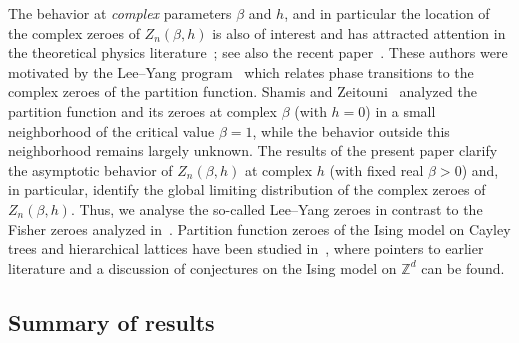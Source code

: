 \documentclass[10pt]{amsart}
\theoremstyle{definition}\newtheorem{defi}[theo]{Definition}\newtheorem{rema}[theo]{Remark}\newtheorem{exam}[theo]{Example}\newtheorem{exem}[theo]{Example}\newtheorem{nota}[theo]{Notation}
\newcommand{\Z}{\mathbb{Z}}
\begin{document}
The behavior at \emph{complex} parameters $\beta$ and $h$, and in particular the location of the complex zeroes of $Z_n(\beta, h)$ is also of interest and has attracted attention in the theoretical physics literature~\cite{deger_brange_flindt,
deger_flindt,glasser_etal,Krasnytska}; see also the recent paper~\cite{newman_motion_yee_yang}. These authors were motivated by the Lee--Yang program~\cite{fisher,lee_yangII,lee_yangI} which relates phase transitions to the complex zeroes of the partition function. Shamis and Zeitouni~\cite{shamis_zeitouni} analyzed the partition function and its zeroes at complex $\beta$ (with $h=0$) in a small neighborhood of the critical value $\beta = 1$, while the behavior outside this neighborhood remains largely unknown. The results of the present paper clarify the asymptotic behavior of $Z_n(\beta, h)$ at complex $h$ (with fixed real $\beta>0$) and, in particular, identify the global limiting distribution of the complex zeroes of $Z_n(\beta, h)$. Thus, we analyse the so-called Lee--Yang zeroes in contrast to the Fisher zeroes analyzed in~\cite{shamis_zeitouni}. Partition function zeroes of the Ising model on Cayley trees and hierarchical lattices have been studied in~\cite{bleher_etal_I,bleher_etal_II,chio_etal}, where pointers to earlier literature and a discussion of conjectures on the Ising model on $\Z^d$ can be found.


\subsection{Summary of results} 
\end{document}
